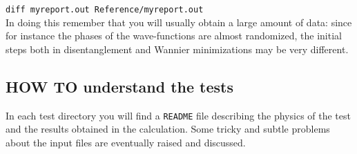         {\tt diff myreport.out Reference/myreport.out } \\

     \noindent
     In doing this remember that you will usually obtain a large amount of data:
      since for instance the phases of the wave-functions are almost
      randomized, the initial steps both in disentanglement and Wannier minimizations
      may be very different.

\subsection*{HOW TO understand the tests}
     In each test directory you will find a {\tt README} file describing the
     physics of the test and the results obtained in the calculation.
     Some tricky and subtle problems about the input files
     are eventually raised and discussed.
